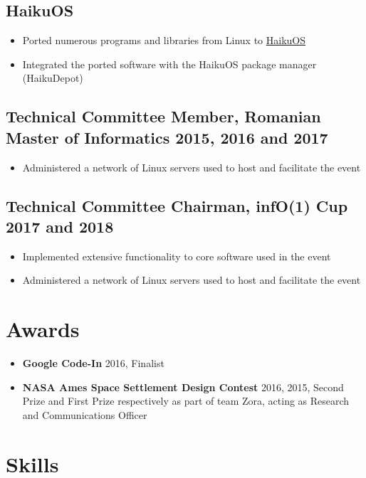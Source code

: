 \documentclass[a4paper]{article}
\begin{document}
\subsection*{HaikuOS}
\begin{itemize}
	\item Ported numerous programs and libraries from Linux to
	      \href{https://www.haiku-os.org/}{HaikuOS}
	\item Integrated the ported software with the HaikuOS package manager
	      (HaikuDepot)
\end{itemize}

\subsection*{Technical Committee Member, Romanian Master of Informatics \hfill
	2015, 2016 and 2017}
\begin{itemize}
	\item Administered a network of Linux servers used to host and facilitate
	      the event
\end{itemize}

\subsection*{Technical Committee Chairman, infO(1) Cup \hfill 2017 and 2018}
\begin{itemize}
	\item Implemented extensive functionality to core software used in the event
	\item Administered a network of Linux servers used to host and facilitate
	      the event
\end{itemize}

\section*{Awards}

\begin{itemize}
	\item \textbf{Google Code-In} 2016, Finalist
	\item \textbf{NASA Ames Space Settlement Design Contest} 2016, 2015, Second Prize and First
	      Prize respectively as part of team Zora, acting as Research and
	      Communications Officer
\end{itemize}

\section*{Skills}
\end{document}
